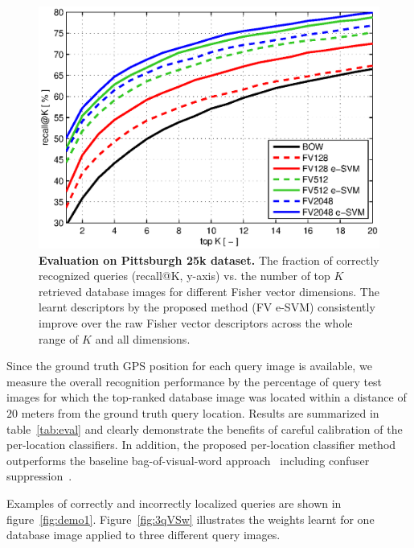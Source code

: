       \begin{figure}[t!]
          \centering
          \includegraphics[width=1.1\linewidth]{imgs/plotPitt25k}    
          \caption{
              \textbf{Evaluation on Pittsburgh 25k \cite{Gronat13} dataset.} The fraction of correctly recognized queries (recall@K, y-axis) vs. the number of top $K$ retrieved database images for different Fisher vector dimensions. The learnt descriptors by the proposed method (FV e-SVM) consistently improve over the raw Fisher vector descriptors across the whole range of $K$  and all dimensions.
          }
          \label{fig:recall}
      \end{figure}


      

      Since the ground truth GPS position for each query image is available, we measure the overall recognition performance by the percentage of query test images for which the top-ranked database image was located within a distance of $20$ meters from the ground truth query location.  Results are summarized in table~\ref{tab:eval} and clearly demonstrate the benefits of  careful calibration of the per-location classifiers. In addition, the proposed per-location classifier method outperforms the baseline bag-of-visual-word approach~\cite{Philbin07} including confuser suppression~\cite{Knopp2010}.

      Examples of correctly and incorrectly localized queries are shown in figure~\ref{fig:demo1}. Figure~\ref{fig:3qVSw} illustrates the weights learnt for one database image applied
      to three different query images.


